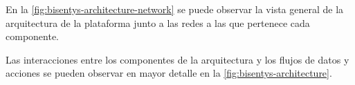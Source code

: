 En la \autoref{fig:bisentys-architecture-network} se puede observar la vista general de la arquitectura de la plataforma junto a las redes a las que pertenece cada componente.


Las interacciones entre los componentes de la arquitectura y los flujos de datos y acciones se pueden observar en mayor detalle en la \autoref{fig:bisentys-architecture}. 

